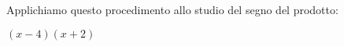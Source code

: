  \begin{esempio}
Applichiamo questo procedimento allo studio del segno del
prodotto:

$(x-4)(x+2)$

%   
%   
%   

\begin{comment}

 \begin{minipage}{.45\textwidth}

 \end{minipage}
 \begin{minipage}{.25\textwidth}

 \end{minipage}
 \begin{minipage}{.3\textwidth}

 \end{minipage}

\end{comment}


\end{esempio}
